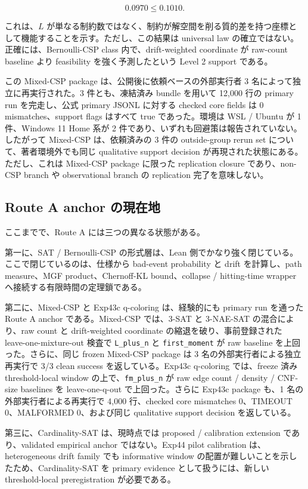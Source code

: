 \documentclass[12pt,a4paper]{article}
\begin{document}
\[
0.0970 \le 0.1010.
\]

これは、\(L\) が単なる制約数ではなく、制約が解空間を削る質的差を持つ座標として機能することを示す。ただし、この結果は universal law の確立ではない。正確には、Bernoulli-CSP class 内で、drift-weighted coordinate が raw-count baseline より feasibility を強く予測したという Level 2 support である。

この Mixed-CSP package は、公開後に依頼ベースの外部実行者 3 名によって独立に再実行された。3 件とも、凍結済み bundle を用いて 12,000 行の primary run を完走し、公式 primary JSONL に対する checked core fields は 0 mismatches、support flags はすべて true であった。環境は WSL / Ubuntu が 1 件、Windows 11 Home 系が 2 件であり、いずれも回避策は報告されていない。したがって Mixed-CSP は、依頼済みの 3 件の outside-group rerun set について、著者環境外でも同じ qualitative support decision が再現された状態にある。ただし、これは Mixed-CSP package に限った replication closure であり、non-CSP branch や observational branch の replication 完了を意味しない。

\subsection{Route A anchor の現在地}\label{route-a-anchor-ux306eux73feux5728ux5730}

ここまでで、Route A には三つの異なる状態がある。

第一に、SAT / Bernoulli-CSP の形式層は、Lean 側でかなり強く閉じている。ここで閉じているのは、仕様から bad-event probability と drift を計算し、path measure、MGF product、Chernoff-KL bound、collapse / hitting-time wrapper へ接続する有限時間の定理鎖である。

第二に、Mixed-CSP と Exp43c q-coloring は、経験的にも primary run を通った Route A anchor である。Mixed-CSP では、3-SAT と 3-NAE-SAT の混合により、raw count と drift-weighted coordinate の縮退を破り、事前登録された leave-one-mixture-out 検査で \texttt{L\_plus\_n} と \texttt{first\_moment} が raw baseline を上回った。さらに、同じ frozen Mixed-CSP package は 3 名の外部実行者による独立再実行で 3/3 clean success を返している。Exp43c q-coloring では、freeze 済み threshold-local window の上で、\texttt{fm\_plus\_n} が raw edge count / density / CNF-size baselines を leave-one-q-out で上回った。さらに Exp43c package も、1 名の外部実行者による再実行で 4,000 行、checked core mismatches 0、TIMEOUT 0、MALFORMED 0、および同じ qualitative support decision を返している。

第三に、Cardinality-SAT は、現時点では proposed / calibration extension であり、validated empirical anchor ではない。Exp44 pilot calibration は、heterogeneous drift family でも informative window の配置が難しいことを示したため、Cardinality-SAT を primary evidence として扱うには、新しい threshold-local preregistration が必要である。
\end{document}
